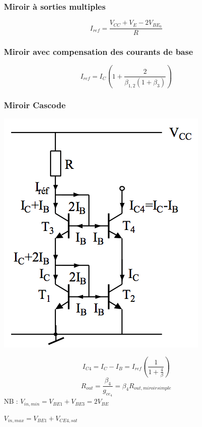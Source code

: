 \documentclass[]{article}
\begin{document}
\subsubsection{Miroir à sorties multiples}
$$ I_{ref} = \frac{V_{CC} + V_E - 2V_{BE_0} }{R} $$

\subsubsection{Miroir avec compensation des courants de base}
$$ I_{ref} = I_C(1+  \frac{2}{\beta_{1,2} (1+\beta_3)}) $$

\subsubsection{Miroir Cascode}
\includegraphics[scale=0.7]{miroircascode}

$$ I_{C4} = I_C-I_B = I_{ref}(\frac{1}{1+\frac{4}{\beta}}) $$
$$ R_{out} = \frac{\beta_4}{g_{ce_4}} = \beta_4 R_{out, miroir simple}$$
NB : 
$ V_{in, min} = V_{BE1} + V_{BE3} = 2V_{BE}  $

$ V_{in,max} = V_{BE1} + V_{CE4,sat} $
\end{document}
